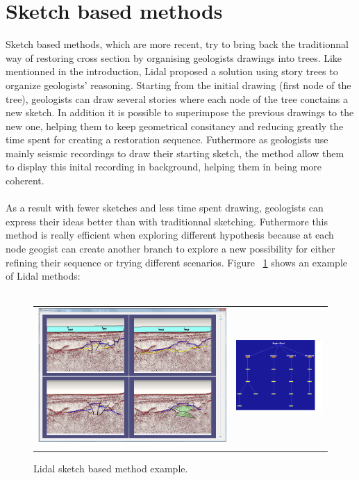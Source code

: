 \documentclass[12pt, a4paper]{report} %
\begin{document}
\section{Sketch based methods}

Sketch based methods, which are more recent, try to bring back the traditionnal way of restoring cross section by organising geologists drawings into trees.
Like mentionned in the introduction, Lidal \cite{lidal} proposed a solution using story trees to organize geologists' reasoning. Starting from the initial drawing (first node of the tree), geologists can draw several stories where each node of the tree conctains a new sketch. In addition it is possible to superimpose the previous drawings to the new one, helping them to keep geometrical consitancy and reducing greatly the time spent for creating a restoration sequence. Futhermore as geologists use mainly seismic recordings to draw their starting sketch, the method allow them to display this inital recording in background, helping them in being more coherent.\\\\
 As a result with fewer sketches and less time spent drawing, geologists can express their ideas better than with traditionnal sketching. Futhermore this method is really efficient when exploring different hypothesis  because at each node geogist can create another branch to explore a new possibility for either refining their sequence or trying different scenarios. Figure ~\ref{lidal} shows an example of Lidal methods:\\\\
 \begin{figure}[H]
\centering
\begin{tabular}{@{}cc@{}}
\includegraphics[width=.45\textwidth]{lidal0.png}&
\includegraphics[width=.45\textwidth]{lidal1.png}\\
\end{tabular}
\caption{Lidal sketch based method example.}
\label{lidal}
\end{figure}
\end{document}
